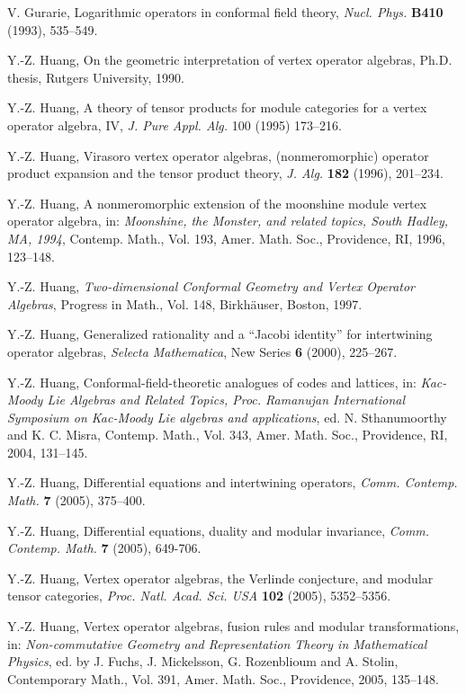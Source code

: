 \documentclass[12pt]{article}
\begin{document}
\begin{thebibliography}{FGST2}
 V. Gurarie, Logarithmic operators in conformal field
theory, {\em Nucl. Phys.} {\bf B410} (1993), 535--549.

Y.-Z. Huang, On the geometric interpretation of vertex operator algebras, 
Ph.D. thesis, Rutgers University, 1990.

Y.-Z. Huang, A theory of tensor products for module categories for a
vertex operator algebra, IV, {\em J. Pure Appl. Alg.} 100 (1995)
173--216.

Y.-Z. Huang, Virasoro vertex operator algebras,
(nonmeromorphic) operator product expansion and the tensor product
theory, {\em J. Alg.} {\bf 182} (1996), 201--234.

 Y.-Z. Huang,
A nonmeromorphic extension of the moonshine module vertex operator
algebra, in: {\em Moonshine, the Monster, and related topics, South
Hadley, MA, 1994},  Contemp. Math., Vol. 193, Amer. Math. Soc.,
Providence, RI, 1996, 123--148.

Y.-Z. Huang, {\em Two-dimensional Conformal Geometry and Vertex
Operator Algebras}, Progress in Math., Vol. 148, Birkh\"{a}user, Boston, 
1997.

 Y.-Z. Huang, Generalized
rationality and a ``Jacobi identity'' for intertwining operator
algebras, {\em Selecta Mathematica}, New Series {\bf 6} (2000),
225--267.

 Y.-Z. Huang, Conformal-field-theoretic analogues
of codes and lattices, in: {\em Kac-Moody Lie Algebras and Related
Topics, Proc. Ramanujan International Symposium on Kac-Moody Lie
algebras and applications}, ed. N. Sthanumoorthy and K. C. Misra,
Contemp. Math., Vol. 343, Amer. Math. Soc., Providence, RI, 2004,
131--145.

 Y.-Z. Huang, Differential equations and
intertwining operators, {\em Comm. Contemp. Math.} {\bf 7} (2005),
375--400.

Y.-Z. Huang,  Differential equations, duality and modular invariance,
{\em Comm. Contemp. Math.} {\bf 7} (2005), 649-706.

 Y.-Z. Huang, Vertex operator algebras, the
Verlinde conjecture, and modular tensor categories, {\em
Proc. Natl. Acad. Sci. USA} {\bf 102} (2005), 5352--5356.

 Y.-Z. Huang, Vertex operator algebras,
fusion rules and modular transformations, in: {\it Non-commutative
Geometry and Representation Theory in Mathematical Physics}, ed. by
J. Fuchs, J. Mickelsson, G. Rozenblioum and A. Stolin, Contemporary
Math., Vol. 391, Amer. Math. Soc., Providence, 2005, 135--148.


\end{thebibliography}
\end{document}
